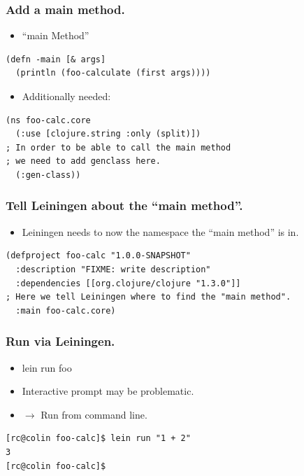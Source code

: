 \documentclass{beamer}
\begin{document}
\begin{frame}[fragile]
\frametitle{Add a main method.}
\begin{itemize}
\item ``main Method''
\end{itemize}
\begin{lstlisting}[basicstyle=\scriptsize]
(defn -main [& args]
  (println (foo-calculate (first args))))
\end{lstlisting}
\begin{itemize}
\item Additionally needed:
\end{itemize}
\begin{lstlisting}[basicstyle=\scriptsize]
(ns foo-calc.core
  (:use [clojure.string :only (split)])
; In order to be able to call the main method
; we need to add genclass here.
  (:gen-class))
\end{lstlisting}
\end{frame}

\begin{frame}[fragile]
\frametitle{Tell Leiningen about the ``main method''.}
\begin{itemize}
\item Leiningen needs to now the namespace the ``main method'' is in.
\end{itemize}
\begin{lstlisting}[basicstyle=\scriptsize]
(defproject foo-calc "1.0.0-SNAPSHOT"
  :description "FIXME: write description"
  :dependencies [[org.clojure/clojure "1.3.0"]]
; Here we tell Leiningen where to find the "main method".
  :main foo-calc.core)
\end{lstlisting}
\end{frame}

\begin{frame}[fragile]
\frametitle{Run via Leiningen.}
\begin{itemize}
\item lein run foo
\item Interactive prompt may be problematic.
\item $\rightarrow$ Run from command line.
\end{itemize}
\begin{lstlisting}[basicstyle=\scriptsize]
[rc@colin foo-calc]$ lein run "1 + 2" 
3
[rc@colin foo-calc]$ 
\end{lstlisting}
\end{frame}
\end{document}
